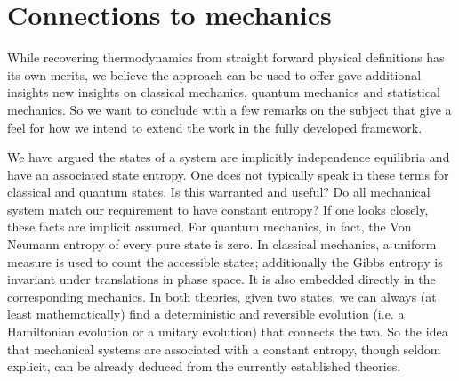 \documentclass[letterpaper,twocolumn]{article}
\begin{document}



\section{Connections to mechanics}

While recovering thermodynamics from straight forward physical definitions has its own merits, we believe the approach can be used to offer gave additional insights new insights on classical mechanics, quantum mechanics and statistical mechanics. So we want to conclude with a few remarks on the subject that give a feel for how we intend to extend the work in the fully developed framework.

We have argued the states of a system are implicitly independence equilibria and have an associated state entropy. One does not typically speak in these terms for classical and quantum states. Is this warranted and useful? Do all mechanical system match our requirement to have constant entropy? If one looks closely, these facts are implicit assumed. For quantum mechanics, in fact, the Von Neumann entropy of every pure state is zero. In classical mechanics, a uniform measure is used to count the accessible states; additionally the Gibbs entropy is invariant under translations in phase space. It is also embedded directly in the corresponding mechanics. In both theories, given two states, we can always (at least mathematically) find a deterministic and reversible evolution (i.e. a Hamiltonian evolution or a unitary evolution) that connects the two. So the idea that mechanical systems are associated with a constant entropy, though seldom explicit, can be already deduced from the currently established theories.
\end{document}
